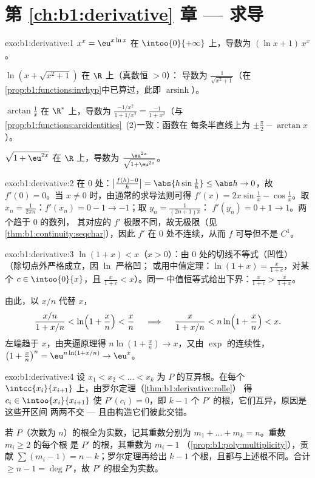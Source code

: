 \section*{第 \ref{ch:b1:derivative} 章 --- 求导}

\begin{solution}{exo:b1:derivative:1}
$x^x = \eu^{x\ln x}$ 在 $\intoo{0}{+\infty}$ 上，导数为 $(\ln x +
1)\,x^x$。

$\ln(x + \sqrt{x^2+1})$ 在 $\R$ 上（真数恒 $> 0$）：
导数为 $\frac{1}{\sqrt{x^2+1}}$（在
\cref{prop:b1:functions:invhyp}中已算过，此即
$\operatorname{arsinh}$）。

$\arctan\frac1x$ 在 $\R^*$ 上，导数为 $\frac{-1/x^2}{1 + 1/x^2} =
\frac{-1}{1 + x^2}$（与
\cref{prop:b1:functions:arcidentities}~(2)一致：函数在
每条半直线上为 $\pm\frac\pi2 - \arctan x$）。

$\sqrt{1 + \eu^{2x}}$ 在 $\R$ 上，导数为
$\frac{\eu^{2x}}{\sqrt{1 + \eu^{2x}}}$。
\end{solution}

\begin{solution}{exo:b1:derivative:2}
在 $0$ 处：$\bigl|\frac{f(h) - 0}{h}\bigr| = \abs{h \sin\frac1h} \leq
\abs h \to 0$，故 $f'(0) = 0$。当 $x \neq 0$ 时，由通常的求导法则可得
$f'(x) = 2x\sin\frac1x - \cos\frac1x$。取 $x_n = \frac{1}{2\pi
n}$：$f'(x_n) = 0 - 1 \to -1$；取 $y_n = \frac{1}{(2n+1)\pi}$：
$f'(y_n) = 0 + 1 \to 1$。两个趋于 $0$ 的数列，
其对应的 $f'$ 极限不同，故无极限（见\cref{thm:b1:continuity:seqchar}），因此 $f'$
在 $0$ 处不连续，从而 $f$ 可导但不是
$C^1$。
\end{solution}

\begin{solution}{exo:b1:derivative:3}
$\ln(1+x) < x$（$x > 0$）：由 $0$ 处的切线不等式（凹性）
（除切点外严格成立，因 $\ln$ 严格凹；
或用中值定理：$\ln(1+x) = \frac{x}{1+c}$，对某个
$c \in \intoo{0}{x}$，且 $\frac{x}{1+c} < x$）。同一
中值恒等式给出下界：$\frac{x}{1+c} > \frac{x}{1+x}$。

由此，以 $x/n$ 代替 $x$，
\[
\frac{x/n}{1 + x/n} < \ln\Bigl(1 + \frac xn\Bigr) < \frac xn
\quad\implies\quad
\frac{x}{1 + x/n} < n \ln\Bigl(1 + \frac xn\Bigr) < x .
\]
左端趋于 $x$，由夹逼原理得 $n\ln(1 + \frac xn)
\to x$，又由 $\exp$ 的连续性，$\bigl(1 + \frac xn\bigr)^n =
\eu^{n\ln(1 + x/n)} \to \eu^x$。
\end{solution}

\begin{solution}{exo:b1:derivative:4}
设 $x_1 < x_2 < \dots < x_k$ 为 $P$ 的互异根。在每个
$\intcc{x_i}{x_{i+1}}$ 上，由罗尔定理（\cref{thm:b1:derivative:rolle}）
得 $c_i \in \intoo{x_i}{x_{i+1}}$ 使 $P'(c_i) = 0$，即
$k - 1$ 个 $P'$ 的根，它们互异，原因是这些开区间
两两不交 --- 且由构造它们彼此交错。

若 $P$（次数为 $n$）的根全为实数，记其重数分别为
$m_1 + \dots + m_k = n$。重数 $m_i \geq 2$ 的每个根
是 $P'$ 的根，其重数为 $m_i - 1$
（\cref{prop:b1:poly:multiplicity}），贡献 $\sum (m_i - 1) = n
- k$；罗尔定理再给出 $k - 1$ 个根，且都与上述根不同。合计
$\geq n - 1 = \deg P'$，故 $P'$ 的根全为实数。
\end{solution}

